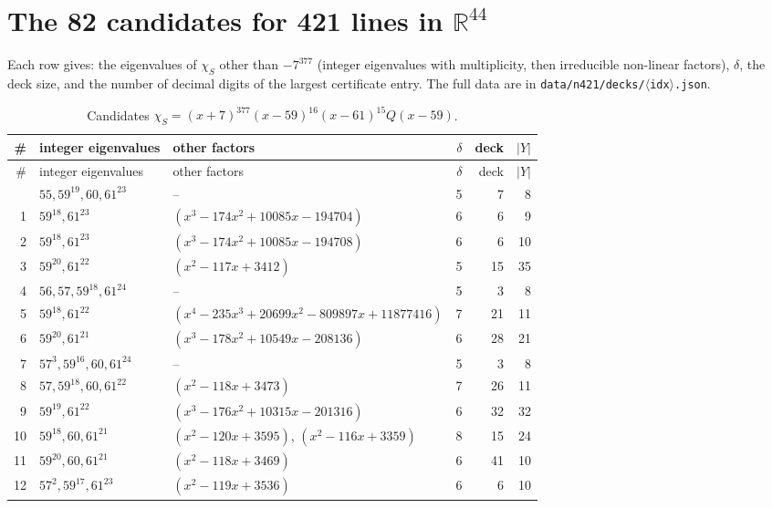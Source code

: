 \documentclass[11pt]{article}
\theoremstyle{definition}
\newcommand{\R}{\mathbb{R}}
\begin{document}
\appendix
\section{\texorpdfstring{The 82 candidates for 421 lines in $\R^{44}$}{The 82 candidates for 421 lines in R\textasciicircum 44}}\label{app:cand}
Each row gives: the eigenvalues of $\chi_S$ other than $-7^{377}$ (integer eigenvalues with
multiplicity, then irreducible non-linear factors), $\delta$, the deck size, and the number of decimal
digits of the largest certificate entry. The full data are in
\texttt{data/n421/decks/$\langle$idx$\rangle$.json}.
{\small
\begin{longtable}{rlp{6.2cm}rrr}
\caption{Candidates $\chi_S=(x+7)^{377}(x-59)^{16}(x-61)^{15}Q(x-59)$.}\label{tab:cand}\\
\toprule
\# & integer eigenvalues & other factors & $\delta$ & deck & $|Y|$ \\
\midrule
\endfirsthead
\toprule
\# & integer eigenvalues & other factors & $\delta$ & deck & $|Y|$ \\
\midrule
\endhead
\bottomrule
\endlastfoot
0 & $55, 59^{19}, 60, 61^{23}$ & -- & 5 & 7 & 8 \\
1 & $59^{18}, 61^{23}$ & $(x^{3} - 174x^{2} + 10085x - 194704)$ & 6 & 6 & 9 \\
2 & $59^{18}, 61^{23}$ & $(x^{3} - 174x^{2} + 10085x - 194708)$ & 6 & 6 & 10 \\
3 & $59^{20}, 61^{22}$ & $(x^{2} - 117x + 3412)$ & 5 & 15 & 35 \\
4 & $56, 57, 59^{18}, 61^{24}$ & -- & 5 & 3 & 8 \\
5 & $59^{18}, 61^{22}$ & $(x^{4} - 235x^{3} + 20699x^{2} - 809897x + 11877416)$ & 7 & 21 & 11 \\
6 & $59^{20}, 61^{21}$ & $(x^{3} - 178x^{2} + 10549x - 208136)$ & 6 & 28 & 21 \\
7 & $57^{3}, 59^{16}, 60, 61^{24}$ & -- & 5 & 3 & 8 \\
8 & $57, 59^{18}, 60, 61^{22}$ & $(x^{2} - 118x + 3473)$ & 7 & 26 & 11 \\
9 & $59^{19}, 61^{22}$ & $(x^{3} - 176x^{2} + 10315x - 201316)$ & 6 & 32 & 32 \\
10 & $59^{18}, 60, 61^{21}$ & $(x^{2} - 120x + 3595)$, $(x^{2} - 116x + 3359)$ & 8 & 15 & 24 \\
11 & $59^{20}, 60, 61^{21}$ & $(x^{2} - 118x + 3469)$ & 6 & 41 & 10 \\
12 & $57^{2}, 59^{17}, 61^{23}$ & $(x^{2} - 119x + 3536)$ & 6 & 6 & 10 \\

\end{longtable}}
\end{document}
